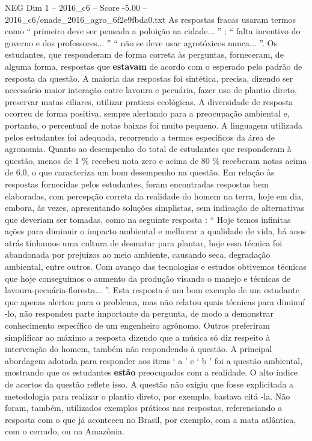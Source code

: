 \begin{textsample}{NEG Dim 1 – 2016\_c6 – Score -5.00 – 2016\_c6/enade\_2016\_agro\_6f2e9fbda0.txt}
As respostas fracas usaram termos como “ primeiro deve ser pensada a poluição na cidade... ” ; “ falta incentivo do governo e dos professores... ” “ não se deve usar agrotóxicos nunca... ”.
Os estudantes, que responderam de forma correta às perguntas, forneceram, de alguma forma, respostas que \textbf{estavam} de acordo com o esperado pelo padrão de resposta da questão.
A maioria das respostas foi sintética, precisa, dizendo ser necessário maior interação entre lavoura e pecuária, fazer uso de plantio direto, preservar matas ciliares, utilizar praticas ecológicas.
A diversidade de resposta ocorreu de forma positiva, sempre alertando para a preocupação ambiental e, portanto, o percentual de notas baixas foi muito pequeno.
A linguagem utilizada pelos estudantes foi adequada, recorrendo a termos específicos da área de agronomia.
Quanto ao desempenho do total de estudantes que responderam à questão, menos de 1 \% recebeu nota zero e acima de 80 \% receberam notas acima de 6,0, o que caracteriza um bom desempenho na questão.
Em relação às respostas fornecidas pelos estudantes, foram encontradas respostas bem elaboradas, com percepção correta da realidade do homem na terra, hoje em dia, embora, às vezes, apresentando soluções simplistas, sem indicação de alternativas que deveriam ser tomadas, como na seguinte resposta : “ Hoje temos infinitas ações para diminuir o impacto ambiental e melhorar a qualidade de vida, há anos atrás tínhamos uma cultura de desmatar para plantar, hoje essa técnica foi abandonada por prejuízos ao meio ambiente, causando seca, degradação ambiental, entre outros.
Com avanço das tecnologias e estudos obtivemos técnicas que hoje conseguimos o aumento da produção visando o manejo e técnicas de lavoura-pecuária-floresta... ”.
Esta resposta é um bom exemplo de um estudante que apenas alertou para o problema, mas não relatou quais técnicas para diminuí -lo, não respondeu parte importante da pergunta, de modo a demonstrar conhecimento específico de um engenheiro agrônomo.
Outros preferiram simplificar ao máximo a resposta dizendo que a música só diz respeito à intervenção do homem, também não respondendo à questão.
A principal abordagem adotada para responder aos itens ‘ a ’ e ‘ b ’ foi a questão ambiental, mostrando que os estudantes \textbf{estão} preocupados com a realidade.
O alto índice de acertos da questão reflete isso.
A questão não exigiu que fosse explicitada a metodologia para realizar o plantio direto, por exemplo, bastava citá -la.
Não foram, também, utilizados exemplos práticos nas respostas, referenciando a resposta com o que já aconteceu no Brasil, por exemplo, com a mata atlântica, com o cerrado, ou na Amazônia.

\end{textsample}
